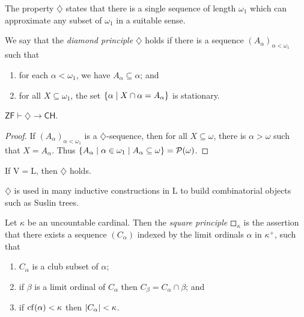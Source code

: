 The property \( \diamondsuit \) states that there is a single sequence of length \( \omega_1 \) which can approximate any subset of \( \omega_1 \) in a suitable sense.
\begin{definition}
    We say that the \emph{diamond principle} \( \diamondsuit \) holds if there is a sequence \( (A_\alpha)_{\alpha < \omega_1} \) such that
    \begin{enumerate}
        \item for each \( \alpha < \omega_1 \), we have \( A_\alpha \subseteq \alpha \); and
        \item for all \( X \subseteq \omega_1 \), the set \( \qty{\alpha \mid X \cap \alpha = A_\alpha} \) is stationary.
    \end{enumerate}
\end{definition}
\begin{lemma}
    \( \mathsf{ZF} \vdash \diamondsuit \to \mathsf{CH} \).
\end{lemma}
\begin{proof}
    If \( (A_\alpha)_{\alpha < \omega_1} \) is a \( \diamondsuit \)-sequence, then for all \( X \subseteq \omega \), there is \( \alpha > \omega \) such that \( X = A_\alpha \).
    Thus \( \qty{A_\alpha \mid \alpha \in \omega_1 \mid A_\alpha \subseteq \omega} = \mathcal P(\omega) \).
\end{proof}
\begin{theorem}
    If \( \mathrm{V} = \mathrm{L} \), then \( \diamondsuit \) holds.
\end{theorem}
\begin{remark}
    \( \diamondsuit \) is used in many inductive constructions in \( \mathrm{L} \) to build combinatorial objects such as Suslin trees.
\end{remark}
\begin{definition}
    Let \( \kappa \) be an uncountable cardinal.
    Then the \emph{square principle} \( \mdwhtsquare_\kappa \) is the assertion that there exists a sequence \( (C_\alpha) \) indexed by the limit ordinals \( \alpha \) in \( \kappa^+ \), such that
    \begin{enumerate}
        \item \( C_\alpha \) is a club subset of \( \alpha \);
        \item if \( \beta \) is a limit ordinal of \( C_\alpha \) then \( C_\beta = C_\alpha \cap \beta \); and
        \item if \( \operatorname{cf}(\alpha) < \kappa \) then \( \abs{C_\alpha} < \kappa \).
    \end{enumerate}
\end{definition}
